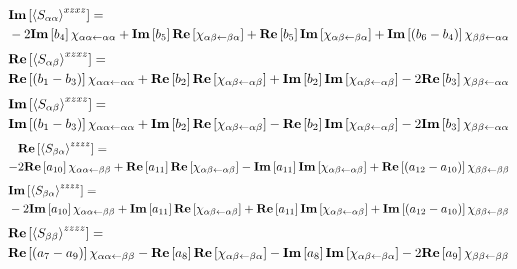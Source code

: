 \begin{align*}
	&\textbf{Im} \left[ \left \langle S_{\alpha \alpha} \right \rangle^{xzxz}  \right] =\\
	 &-2  \textbf{Im} \left[ b_4 \right] \chi_{ \alpha \alpha \leftarrow \alpha \alpha}  + \textbf{Im} \left[ b_5 \right] \textbf{Re} \left[  \chi_{\alpha \beta \leftarrow \beta \alpha}  \right] + \textbf{Re} \left[ b_5 \right] \textbf{Im} \left[  \chi_{\alpha \beta \leftarrow \beta \alpha}  \right]+ \textbf{Im} \left[ \left( b_6 - b_4 \right) \right] \chi_{\beta \beta \leftarrow \alpha \alpha}
\end{align*}
\begin{align*}
	&\textbf{Re} \left[ \left \langle S_{\alpha \beta} \right \rangle^{xzxz} \right] =\\
	  &\textbf{Re} \left[ \left( b_1 - b_3 \right)  \right] \chi_{\alpha \alpha \leftarrow \alpha \alpha} + \textbf{Re} \left[ b_2 \right] \textbf{Re} \left[  \chi_{\alpha \beta \leftarrow \alpha \beta} \right] +  \textbf{Im} \left[ b_2 \right] \textbf{Im} \left[  \chi_{\alpha \beta \leftarrow \alpha \beta} \right]- 2 \textbf{Re} \left[ b_3 \right]  \chi_{\beta \beta \leftarrow \alpha \alpha}
\end{align*}
\begin{align*}
	&\textbf{Im} \left[ \left \langle S_{\alpha \beta} \right \rangle^{xzxz} \right] =\\
	 &\textbf{Im} \left[ \left( b_1 - b_3 \right)  \right] \chi_{\alpha \alpha \leftarrow \alpha \alpha} + \textbf{Im} \left[ b_2 \right] \textbf{Re} \left[  \chi_{\alpha \beta \leftarrow \alpha \beta} \right] - \textbf{Re} \left[ b_2 \right] \textbf{Im} \left[  \chi_{\alpha \beta \leftarrow \alpha \beta} \right]- 2 \textbf{Im} \left[ b_3 \right]  \chi_{\beta \beta \leftarrow \alpha \alpha}
\end{align*}
\begin{align*}
	&\textbf{Re} \left[  \left \langle S_{\beta \alpha} \right \rangle^{zzzz}  \right] =\\
	 -& 2 \textbf{Re} \left[  a_{10} \right]  \chi_{ \alpha \alpha \leftarrow \beta \beta}   + \textbf{Re} \left[  a_{11} \right]  \textbf{Re} \left[ \chi_{ \alpha  \beta\leftarrow \alpha \beta } \right] - \textbf{Im} \left[  a_{11} \right]  \textbf{Im} \left[ \chi_{ \alpha  \beta\leftarrow \alpha \beta } \right]  +\textbf{Re} \left[ \left(  a_{12} - a_{10} \right)  \right]\chi_{ \beta \beta \leftarrow \beta \beta }
\end{align*}
\begin{align*}
	&\textbf{Im} \left[  \left \langle S_{\beta \alpha} \right \rangle^{zzzz}  \right] =\\
	 &- 2 \textbf{Im} \left[  a_{10} \right]  \chi_{ \alpha \alpha \leftarrow \beta \beta}   + \textbf{Im} \left[  a_{11} \right]  \textbf{Re} \left[ \chi_{ \alpha  \beta\leftarrow \alpha \beta } \right] + \textbf{Re} \left[  a_{11} \right]  \textbf{Im} \left[ \chi_{ \alpha  \beta\leftarrow \alpha \beta } \right]  +\textbf{Im} \left[ \left(  a_{12} - a_{10} \right)  \right]\chi_{ \beta \beta \leftarrow \beta \beta }
\end{align*}
\begin{align*}
	&\textbf{Re} \left[  \left \langle S_{\beta \beta} \right \rangle^{zzzz}  \right] =\\
	  &\textbf{Re} \left[ \left( a_7 - a_9 \right) \right]   \chi_{ \alpha \alpha \leftarrow \beta \beta } - \textbf{Re} \left[ a_8 \right] \textbf{Re} \left[ \chi_{\alpha \beta \leftarrow \beta \alpha} \right] - \textbf{Im} \left[ a_8 \right] \textbf{Im} \left[ \chi_{\alpha \beta \leftarrow \beta \alpha} \right]  - 2 \textbf{Re} \left[ a_9 \right]  \chi_{ \beta \beta \leftarrow \beta \beta}
\end{align*}
